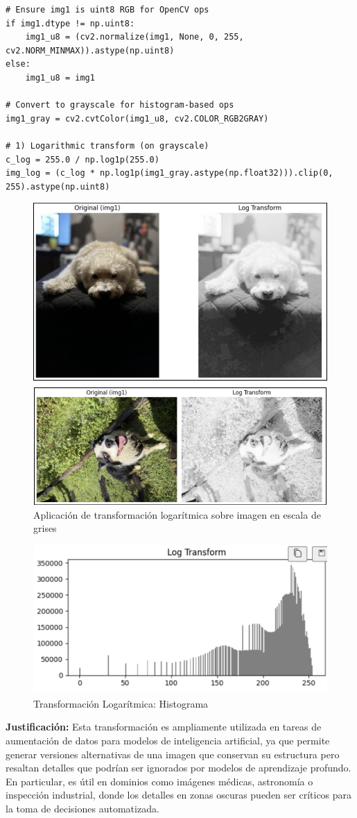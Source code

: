\documentclass[12pt,letterpaper]{article}
\begin{document}
\begin{verbatim}
# Ensure img1 is uint8 RGB for OpenCV ops
if img1.dtype != np.uint8:
    img1_u8 = (cv2.normalize(img1, None, 0, 255, cv2.NORM_MINMAX)).astype(np.uint8)
else:
    img1_u8 = img1

# Convert to grayscale for histogram-based ops
img1_gray = cv2.cvtColor(img1_u8, cv2.COLOR_RGB2GRAY)

# 1) Logarithmic transform (on grayscale)
c_log = 255.0 / np.log1p(255.0)
img_log = (c_log * np.log1p(img1_gray.astype(np.float32))).clip(0, 255).astype(np.uint8)
\end{verbatim}

\begin{figure}[H]
  \centering
  \includegraphics[width=0.5\linewidth]{figuras/transformacion_log.png}
  \caption{Aplicación de transformación logarítmica sobre imagen en escala de grises}
  \label{fig:transformacion_logaritmica}
\end{figure}

\begin{figure}[H]
  \centering
  \includegraphics[width=0.5\linewidth]{figuras/histograma_transformacion_logaritmica.png}
  \caption{Transformación Logarítmica: Histograma}
  \label{fig:histograma_transformacion_logaritmica}
\end{figure}

\textbf{Justificación:} Esta transformación es ampliamente utilizada en tareas de aumentación de datos para modelos de inteligencia artificial, ya que permite generar versiones alternativas de una imagen que conservan su estructura pero resaltan detalles que podrían ser ignorados por modelos de aprendizaje profundo. En particular, es útil en dominios como imágenes médicas, astronomía o inspección industrial, donde los detalles en zonas oscuras pueden ser críticos para la toma de decisiones automatizada.
\end{document}
